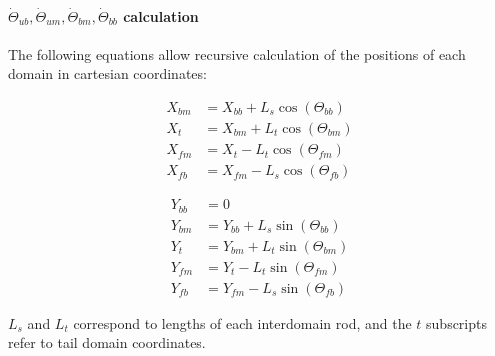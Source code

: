 \documentclass[10pt]{article} %
\begin{document}

\paragraph{$\dot{\Theta}_{ub}, \dot{\Theta}_{um}, \dot{\Theta}_{bm}, \dot{\Theta}_{bb}$ calculation}

The following equations allow recursive calculation of the positions of each domain in cartesian coordinates:

\noindent\begin{minipage}{0.49\linewidth}
\begin{align}
  X_{bm} &= X_{bb}+L_{s}\cos(\Theta_{bb}) \\
  X_{t}  &= X_{bm}+L_{t}\cos(\Theta_{bm}) \\
  X_{fm} &= X_{t} - L_{t}\cos(\Theta_{fm}) \\
  X_{fb} &= X_{fm} - L_{s}\cos(\Theta_{fb})
\end{align}
\end{minipage}
\begin{minipage}{0.49\linewidth}
\begin{align}
  Y_{bb} &= 0 \\
  Y_{bm} &= Y_{bb}+L_{s}\sin(\Theta_{bb}) \\
  Y_{t}  &= Y_{bm}+L_{t}\sin(\Theta_{bm}) \\
  Y_{fm} &= Y_{t} - L_{t}\sin(\Theta_{fm}) \\
  Y_{fb} &= Y_{fm} - L_{s}\sin(\Theta_{fb})
\end{align}
\end{minipage}
\vspace{.5cm}

$L_s$ and $L_t$ correspond to lengths of each interdomain rod, and the $t$ subscripts refer to tail domain coordinates.\\
\end{document}
